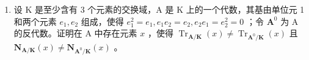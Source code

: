 \BourbakiExercisesSection

\begin{enumerate}
\def\labelenumi{\arabic{enumi}.}
\tightlist
\item
  设 K 是至少含有 3 个元素的交换域，A 是 K 上的一个代数，其基由单位元 1 和两个元素 \(e_1, e_2\) 组成，使得 \(e_1^2 = e_1, e_1e_2 = e_2, e_2e_1 = e_2^2 = 0\) ；令 \(\mathbf{A}^0\) 为 A 的反代数。证明在 A 中存在元素 \(x\) ，使得 \(\operatorname{Tr}_{\mathbf{A} / \mathbf{K}}(x) \neq \operatorname{Tr}_{\mathbf{A}^0 / \mathbf{K}}(x)\) 且 \(\mathbf{N}_{\mathbf{A} / \mathbf{K}}(x) \neq \mathbf{N}_{\mathbf{A}^0 / \mathbf{K}}(x)\) 。
\end{enumerate}

